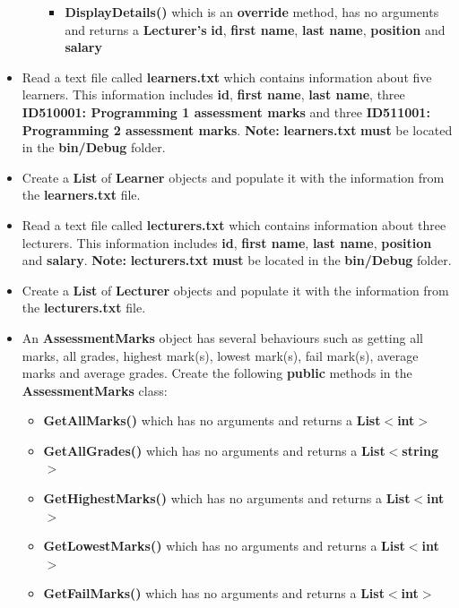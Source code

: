 \documentclass{article}
\begin{document}
\begin{itemize}
\begin{itemize}
\begin{itemize}
            \item \textbf{DisplayDetails()} which is an \textbf{override} method, has no arguments and returns a \textbf{Lecturer's} \textbf{id}, \textbf{first name}, \textbf{last name}, \textbf{position} and \textbf{salary}
        \end{itemize}
    \end{itemize}
    \item Read a text file called \textbf{learners.txt} which contains information about five learners. This information includes \textbf{id}, \textbf{first name}, \textbf{last name}, three \textbf{ID510001: Programming 1 assessment marks} and three \textbf{ID511001: Programming 2 assessment marks}. \textbf{Note:} \textbf{learners.txt} \textbf{must} be located in the \textbf{bin/Debug} folder.
    \item Create a \textbf{List} of \textbf{Learner} objects and populate it with the information from the \textbf{learners.txt} file.
    \item Read a text file called \textbf{lecturers.txt} which contains information about three lecturers. This information includes \textbf{id}, \textbf{first name}, \textbf{last name}, \textbf{position} and \textbf{salary}. \textbf{Note:} \textbf{lecturers.txt} \textbf{must} be located in the \textbf{bin/Debug} folder.
    \item Create a \textbf{List} of \textbf{Lecturer} objects and populate it with the information from the \textbf{lecturers.txt} file.
    \item An \textbf{AssessmentMarks} object has several behaviours such as getting all marks, all grades, highest mark(s), lowest mark(s), fail mark(s), average marks and average grades. Create the following \textbf{public} methods in the \textbf{AssessmentMarks} class:
    \begin{itemize}
        \item \textbf{GetAllMarks()} which has no arguments and returns a \textbf{List$<$int$>$} 
        \item \textbf{GetAllGrades()} which has no arguments and returns a \textbf{List$<$string$>$}
        \item \textbf{GetHighestMarks()} which has no arguments and returns a \textbf{List$<$int$>$}
        \item \textbf{GetLowestMarks()} which has no arguments and returns a \textbf{List$<$int$>$}
        \item \textbf{GetFailMarks()} which has no arguments and returns a \textbf{List$<$int$>$}

\end{itemize}
\end{itemize}
\end{document}
